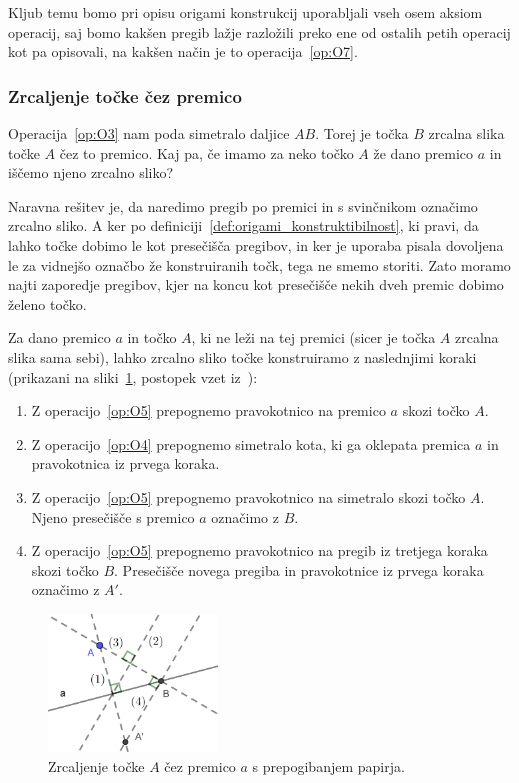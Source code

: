 Kljub temu bomo pri opisu origami konstrukcij uporabljali vseh osem aksiom operacij, saj bomo kakšen pregib lažje razložili preko ene od ostalih petih operacij kot pa opisovali, na kakšen način je to operacija~\ref{op:O7}.

\subsubsection{Zrcaljenje točke čez premico}
\label{podpogl:zrcaljenje_origami}

Operacija~\ref{op:O3} nam poda simetralo daljice $AB$. Torej je točka $B$ zrcalna slika točke $A$ čez to premico. Kaj pa, če imamo za neko točko $A$ že dano premico $a$ in iščemo njeno zrcalno sliko?

Naravna rešitev je, da naredimo pregib po premici in s svinčnikom označimo zrcalno sliko. A ker po definiciji~\ref{def:origami_konstruktibilnost}, ki pravi, da lahko točke dobimo le kot presečišča pregibov, in ker je uporaba pisala dovoljena le za vidnejšo označbo že konstruiranih točk, tega ne smemo storiti. Zato moramo najti zaporedje pregibov, kjer na koncu kot presečišče nekih dveh premic dobimo želeno točko.

Za dano premico $a$ in točko $A$, ki ne leži na tej premici (sicer je točka $A$ zrcalna slika sama sebi), lahko zrcalno sliko točke konstruiramo z naslednjimi koraki (prikazani na sliki~\ref{fig:zrcaljenje_cez_premico}, postopek vzet iz~\cite[str.\ 28]{hull2020}):
\begin{enumerate}
    \item Z operacijo~\ref{op:O5} prepognemo pravokotnico na premico $a$ skozi točko $A$.
    \item Z operacijo~\ref{op:O4} prepognemo simetralo kota, ki ga oklepata premica $a$ in pravokotnica iz prvega koraka.
    \item Z operacijo~\ref{op:O5} prepognemo pravokotnico na simetralo skozi točko $A$. Njeno presečišče s premico $a$ označimo z $B$.
    \item Z operacijo~\ref{op:O5} prepognemo pravokotnico na pregib iz tretjega koraka skozi točko $B$. Presečišče novega pregiba in pravokotnice iz prvega koraka označimo z $A'$.
\end{enumerate}

\begin{figure}[h]
    \centering
    \includegraphics[width=0.4\textwidth]{images/zrcaljenje_tocke_cez_premico.png}
    \caption[Zrcaljenje čez premico]{Zrcaljenje točke $A$ čez premico $a$ s prepogibanjem papirja.}
    \label{fig:zrcaljenje_cez_premico}
\end{figure}

